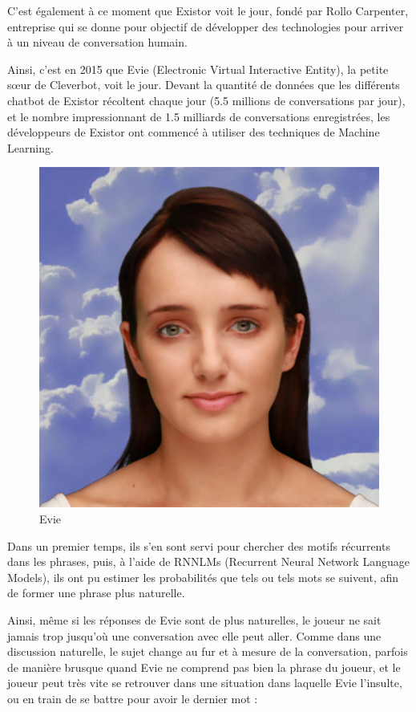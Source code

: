 \documentclass[a4paper, 12pt]{article} %
\begin{document}
C'est également à ce moment que Existor voit le jour, fondé par Rollo Carpenter, entreprise qui se donne pour objectif de développer des technologies pour arriver à un niveau de conversation humain.

Ainsi, c’est en 2015 que Evie (Electronic Virtual Interactive Entity), la petite sœur de Cleverbot, voit le jour. Devant la quantité de données que les différents chatbot de Existor récoltent chaque jour (5.5 millions de conversations par jour), et le nombre impressionnant de 1.5 milliards de conversations enregistrées, les développeurs de Existor ont commencé à utiliser des techniques de Machine Learning. 

\begin{figure}[!h]%
	\begin{center} 
		\includegraphics[width=0.60\columnwidth]{images/evie.png}%
		\caption{Evie}%
	\end{center}
\end{figure}

Dans un premier temps, ils s’en sont servi pour chercher des motifs récurrents dans les phrases, puis, à l’aide de RNNLMs (Recurrent Neural Network Language Models), ils ont pu estimer les probabilités que tels ou tels mots se suivent, afin de former une phrase plus naturelle.

Ainsi, même si les réponses de Evie sont de plus naturelles, le joueur ne sait jamais trop jusqu'où une conversation avec elle peut aller. Comme dans une discussion naturelle, le sujet change au fur et à mesure de la conversation, parfois de manière brusque quand Evie ne comprend pas bien la phrase du joueur, et le joueur peut très vite se retrouver dans une situation dans laquelle Evie l'insulte, ou en train de se battre pour avoir le dernier mot :
\end{document}
